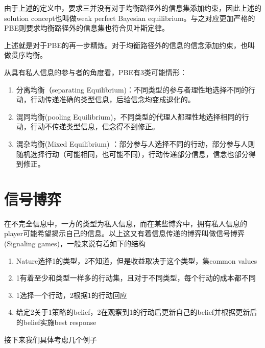 \documentclass[UTF8,12pt]{ctexart}
\numberwithin{equation}{section} %
\numberwithin{figure}{section}
\numberwithin{table}{section}
\begin{document}
	由于上述的定义中，要求三并没有对于均衡路径外的信息集添加约束，因此上述的solution concept也叫做weak perfect Bayesian equilibrium。与之对应更加严格的PBE则要求均衡路径外的信息集也符合贝叶斯定律。
	
	上述就是对于PBE的再一步精炼。对于均衡路径外的信息的信念添加约束，也叫做贯序均衡。
	
	从具有私人信息的参与者的角度看，PBE有3类可能情形：
	\begin{enumerate}
		\item 分离均衡（separating Equilibrium)：不同类型的参与者理性地选择不同的行动，行动传递准确的类型信息，后验信念均变成退化的。
		
		\item 混同均衡(pooling Equilibrium)，不同类型的代理人都理性地选择相同的行动，行动不传递类型信息，信念得不到修正。
		
		\item 混杂均衡(Mixed Equilibrium) ：部分参与人选择不同的行动，部分参与人则随机选择行动（可能相同，也可能不同），行动传递部分信息，信念也部分得到修正。
	\end{enumerate}
	
	\newpage 
	
	\section{信号博弈}
	在不完全信息中，一方的类型为私人信息，而在某些博弈中，拥有私人信息的player可能希望揭示自己的信息。以上这又有着信息传递的博弈叫做信号博弈(Signaling games)，一般来说有着如下的结构
	\begin{enumerate}
		\item Nature选择1的类型，2不知道，但是收益取决于这个类型，集common values
		
		\item 1有着至少和类型一样多的行动集，且对于不同类型，每个行动的成本都不同
		
		\item 1选择一个行动，2根据1的行动回应
		
		\item 给定2关于1策略的belief，2在观察到1的行动后更新自己的belief并根据更新后的belief实施best response
	\end{enumerate}
	接下来我们具体考虑几个例子
	
\end{document}

